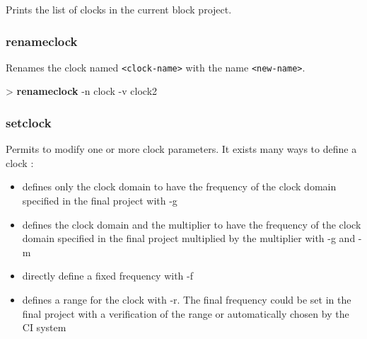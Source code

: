\documentclass[10pt,a4paper]{article}
\begin{document}
Prints the list of clocks in the current block project.

\subsubsection{renameclock}
\label{subsec:renameclock}

Renames the clock named \texttt{<clock-name>} with the name \texttt{<new-name>}.\\


\begin{sampletitle}
> \textbf{\tool{} renameclock} -n clock -v clock2
\end{sampletitle}


\subsubsection{setclock}
\label{subsec:setclock}

Permits to modify one or more clock parameters. It exists many ways to define a clock :
\begin{itemize}
\item defines only the clock domain to have the frequency of the clock domain specified in the final project with -g
\item defines the clock domain and the multiplier to have the frequency of the clock domain specified in the final project multiplied by the multiplier with -g and -m
\item directly define a fixed frequency with -f
\item defines a range for the clock with -r. The final frequency could be set in the final project with a verification of the range or automatically chosen by the CI system
\end{itemize}

\end{document}
